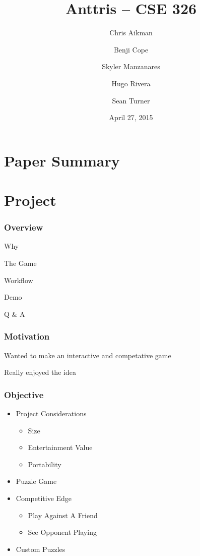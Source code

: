 \documentclass{beamer}
\title{Anttris -- CSE 326}
\author{%
\and Chris Aikman
\and Benji Cope
\and Skyler Manzanares
\and Hugo Rivera
\and Sean Turner}
\date{April 27, 2015}
\begin{document}
\section{Paper Summary}





\section{Project}

\begin{frame}
  \frametitle{Overview} %
  \item Why
  \item The Game
  \item Workflow
  \item Demo
  \item Q & A
\end{frame}

\begin{frame}
  \frametitle{Motivation} %
  \pause \item Wanted to make an interactive and competative game
  \pause \item Really enjoyed the idea
\end{frame}

\begin{frame}
  \frametitle{Objective} %
  \begin{itemize}
	\item Project Considerations
	\begin{itemize}
		\pause \item Size
		\pause \item Entertainment Value
		\pause \item Portability
	\end{itemize}
	\pause \item Puzzle Game
	\pause \item Competitive Edge
	\begin{itemize}
		\pause \item Play Against A Friend
		\pause \item See Opponent Playing
	\end{itemize}
	\pause \item Custom Puzzles
  \end{itemize}
\end{frame}
\end{document}
